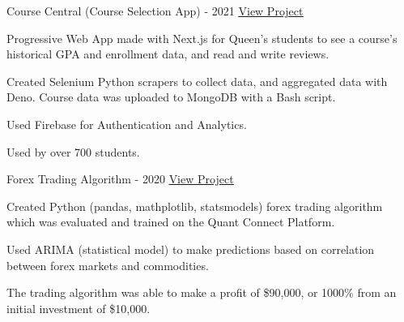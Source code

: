 

\begin{cventries}

  \cventry
    {} %
    {Course Central (Course Selection App) - 2021} %
    {\href{https://coursecentral.ca/}{\underline{View Project}}} %
    {} %
    {
      \begin{cvitems} %
        \item {Progressive Web App made with Next.js for Queen's students to see a course's historical GPA and enrollment data, and read and write reviews.}
        \item {Created Selenium Python scrapers to collect data, and aggregated data with Deno. Course data was uploaded to MongoDB with a Bash script.}
        \item {Used Firebase for Authentication and Analytics.}
        \item {Used by over 700 students.}
      \end{cvitems}
    }

  \cventry
    {} %
    {Forex Trading Algorithm - 2020} %
    {\href{https://github.com/KnlnKS/Forex-Price-Predictor-Quantconnect}{\underline{View Project}}} %
    {} %
    {
      \begin{cvitems} %
        \item {Created Python (pandas, mathplotlib, statsmodels) forex trading algorithm which was evaluated and trained on the Quant Connect Platform.}
        \item {Used ARIMA (statistical model) to make predictions based on correlation between forex markets and commodities.}
        \item {The trading algorithm was able to make a profit of \$90,000, or 1000\% from an initial investment of \$10,000.}
      \end{cvitems}
    }


\end{cventries}
